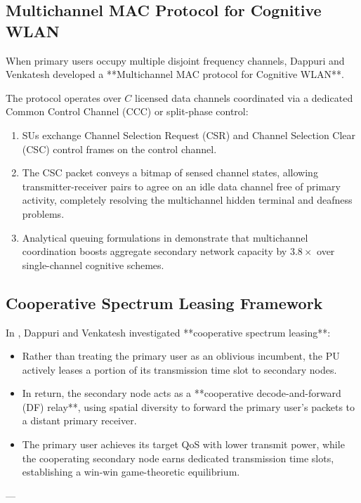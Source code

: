 \subsection{Multichannel MAC Protocol for Cognitive WLAN}
When primary users occupy multiple disjoint frequency channels, Dappuri and Venkatesh \cite{dappuri2018multichannel} developed a **Multichannel MAC protocol for Cognitive WLAN**.

The protocol operates over $C$ licensed data channels coordinated via a dedicated Common Control Channel (CCC) or split-phase control:
\begin{enumerate}
    \item SUs exchange Channel Selection Request (CSR) and Channel Selection Clear (CSC) control frames on the control channel.
    \item The CSC packet conveys a bitmap of sensed channel states, allowing transmitter-receiver pairs to agree on an idle data channel free of primary activity, completely resolving the multichannel hidden terminal and deafness problems.
    \item Analytical queuing formulations in \cite{dappuri2018multichannel} demonstrate that multichannel coordination boosts aggregate secondary network capacity by $3.8\times$ over single-channel cognitive schemes.
\end{enumerate}

\subsection{Cooperative Spectrum Leasing Framework}
In \cite{dappuri2018analytical}, Dappuri and Venkatesh investigated **cooperative spectrum leasing**:
\begin{itemize}
    \item Rather than treating the primary user as an oblivious incumbent, the PU actively leases a portion of its transmission time slot to secondary nodes.
    \item In return, the secondary node acts as a **cooperative decode-and-forward (DF) relay**, using spatial diversity to forward the primary user's packets to a distant primary receiver.
    \item The primary user achieves its target QoS with lower transmit power, while the cooperating secondary node earns dedicated transmission time slots, establishing a win-win game-theoretic equilibrium.
\end{itemize}

---

